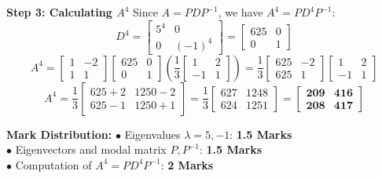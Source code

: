 \begin{solutionbox}
\textbf{Step 3: Calculating $A^4$}
Since $A = P D P^{-1}$, we have $A^4 = P D^4 P^{-1}$:
\[
D^4 = \begin{bmatrix} 5^4 & 0 \\ 0 & (-1)^4 \end{bmatrix} = \begin{bmatrix} 625 & 0 \\ 0 & 1 \end{bmatrix}
\]
\[
A^4 = \begin{bmatrix} 1 & -2 \\ 1 & 1 \end{bmatrix}\begin{bmatrix} 625 & 0 \\ 0 & 1 \end{bmatrix} \left(\frac{1}{3}\begin{bmatrix} 1 & 2 \\ -1 & 1 \end{bmatrix}\right) = \frac{1}{3}\begin{bmatrix} 625 & -2 \\ 625 & 1 \end{bmatrix}\begin{bmatrix} 1 & 2 \\ -1 & 1 \end{bmatrix}
\]
\[
A^4 = \frac{1}{3}\begin{bmatrix} 625 + 2 & 1250 - 2 \\ 625 - 1 & 1250 + 1 \end{bmatrix} = \frac{1}{3}\begin{bmatrix} 627 & 1248 \\ 624 & 1251 \end{bmatrix} = \mathbf{\begin{bmatrix} 209 & 416 \\ 208 & 417 \end{bmatrix}}
\]

\begin{markingrubric}
\textbf{Mark Distribution:}
$\bullet$ Eigenvalues $\lambda = 5, -1$: \textbf{1.5 Marks}\\
$\bullet$ Eigenvectors and modal matrix $P, P^{-1}$: \textbf{1.5 Marks}\\
$\bullet$ Computation of $A^4 = P D^4 P^{-1}$: \textbf{2 Marks}
\end{markingrubric}
\end{solutionbox}

